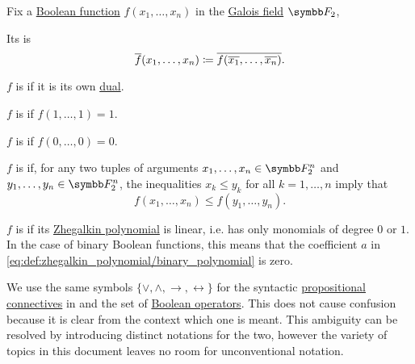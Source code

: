 \begin{definition}\label{def:boolean_functions_in_f2}
  Fix a \hyperref[def:boolean_function]{Boolean function} \( f(x_1, \ldots, x_n) \) in the \hyperref[thm:galois_field_existence]{Galois field} \( \BF_2 \),

  \begin{DefEnum}
     Its  is
    \begin{equation*}
      \overline{f}(x_1, \ldots, x_n) \coloneqq \overline{f(\overline{x_1}, \ldots, \overline{x_n})}.
    \end{equation*}

     \( f \) is  if it is its own \hyperref[def:boolean_function_in_f2/dual]{dual}.

     \( f \) is  if \( f(1, \ldots, 1) = 1 \).

     \( f \) is  if \( f(0, \ldots, 0) = 0 \).

     \( f \) is  if, for any two tuples of arguments \( x_1, \ldots, x_n \in \BF_2^n \) and \( y_1, \ldots, y_n \in \BF_2^n \), the inequalities \( x_k \leq y_k \) for all \( k = 1, \ldots, n \) imply that
    \begin{equation*}
      f(x_1, \ldots, x_n) \leq f(y_1, \ldots, y_n).
    \end{equation*}

     \( f \) is  if its \hyperref[def:zhegalkin_polynomial]{Zhegalkin polynomial} is linear, i.e. has only monomials of degree \( 0 \) or \( 1 \). In the case of binary Boolean functions, this means that the coefficient \( a \) in \eqref{eq:def:zhegalkin_polynomial/binary_polynomial} is zero.
  \end{DefEnum}
\end{definition}

\begin{remark}\label{thm:propositional_connectives_ambiguity}
  We use the same symbols \( \{ \vee, \wedge, \rightarrow, \leftrightarrow \} \) for the syntactic \hyperref[def:propositional_alphabet/connectives]{propositional connectives} in  and the set of \hyperref[def:standard_boolean_operators]{Boolean operators}. This does not cause confusion because it is clear from the context which one is meant. This ambiguity can be resolved by introducing distinct notations for the two, however the variety of topics in this document leaves no room for unconventional notation.
\end{remark}


